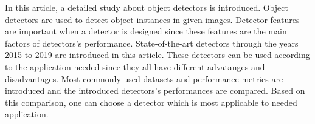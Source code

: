 \documentclass{article}
\begin{document}
\setlength{\parindent}{6ex}

\indent

In this article, a detailed study about object detectors is introduced. Object detectors 
are used to detect object instances in given images. Detector features are important when 
a detector is designed since these features are the main factors of detectors's performance. 
State-of-the-art detectors through the years 2015 to 2019 are introduced in this article. 
These detectors can be used according to the application needed since they all have different 
advatanges and disadvantages. Most commonly used datasets and performance metrics are introduced 
and the introduced detectors's performances are compared. Based on this comparison, one can 
choose a detector which is most applicable to needed application. 
\end{document}
